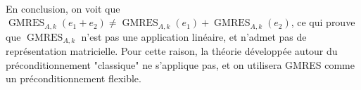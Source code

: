 \paragraph{}
En conclusion, on voit que $\operatorname{GMRES}_{A, k}\left(e_1 + e_2\right) \neq \operatorname{GMRES}_{A, k}\left(e_1\right) + \operatorname{GMRES}_{A, k}\left(e_2\right)$, ce qui prouve que $\operatorname{GMRES}_{A, k}$ n'est pas une application linéaire, et n'admet pas de représentation matricielle.
Pour cette raison, la théorie développée autour du préconditionnement "classique" ne s'applique pas, et on utilisera GMRES comme un préconditionnement flexible.
